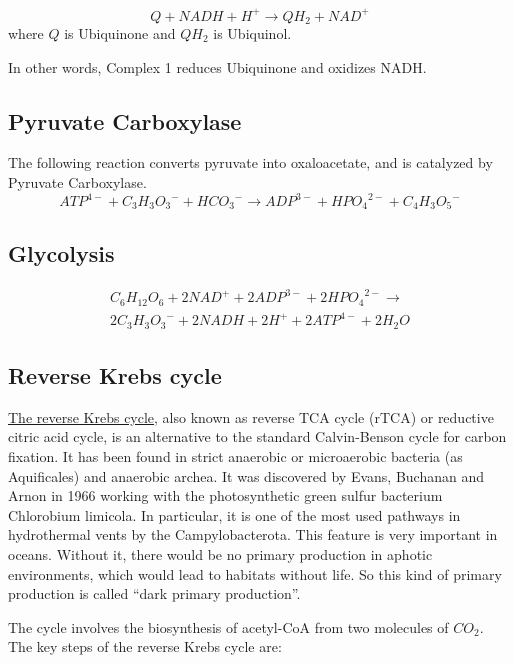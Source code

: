 \documentclass{article}
\begin{document}
\[
    Q + NADH + H^+ \rightarrow QH_2 + NAD^+
\]
where $Q$ is Ubiquinone and $QH_2$ is Ubiquinol.

In other words, Complex 1 reduces Ubiquinone and oxidizes NADH\@.

\subsection{Pyruvate Carboxylase}
The following reaction converts pyruvate into oxaloacetate, and is catalyzed by Pyruvate
Carboxylase.
\[
    {ATP}^{4-} + {C_3H_3O_3}^- + {HCO_3}^- \rightarrow
    {ADP}^{3-} + {HPO_4}^{2-} + {C_4H_3O_5}^-
\]

\subsection{Glycolysis}
\[
    \begin{split}
    C_6H_{12}O_6 + 2{NAD}^+ + 2{ADP}^{3-} + 2{HPO_4}^{2-} \rightarrow \\
    2{C_3H_3O_3}^- + 2NADH + 2H^+ + 2{ATP}^{4-} + 2H_2O
    \end{split}
\]

\subsection{Reverse Krebs cycle}
\href{https://en.wikipedia.org/wiki/Biological_carbon_fixation}{The reverse Krebs cycle},
also known as reverse TCA cycle (rTCA) or reductive citric acid
cycle, is an alternative to the standard Calvin-Benson cycle for carbon fixation. It has
been found in strict anaerobic or microaerobic bacteria (as Aquificales) and anaerobic
archea. It was discovered by Evans, Buchanan and Arnon in 1966 working with the
photosynthetic green sulfur bacterium Chlorobium limicola. In particular, it is one of
the most used pathways in hydrothermal vents by the Campylobacterota. This feature is
very important in oceans. Without it, there would be no primary production in aphotic
environments, which would lead to habitats without life. So this kind of primary
production is called ``dark primary production''.

The cycle involves the biosynthesis of acetyl-CoA from two molecules of $CO_2$. The key
steps of the reverse Krebs cycle are:
\end{document}
